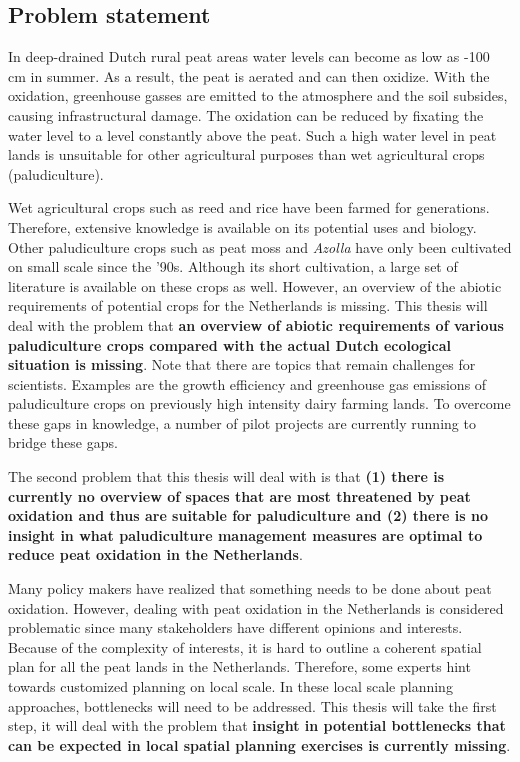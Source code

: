 \documentclass[12pt,a4paper,titlepage]{article}
\begin{document}



\subsection{Problem statement}
In deep-drained Dutch rural peat areas water levels can become as low as -100 cm in summer. As a result, the peat is aerated and can then oxidize. With the oxidation, greenhouse gasses are emitted to the atmosphere and the soil subsides, causing infrastructural damage. The oxidation can be reduced by fixating the water level to a level constantly above the peat. Such a high water level in peat lands is unsuitable for other agricultural purposes than wet agricultural crops (paludiculture).

Wet agricultural crops such as reed and rice have been farmed for generations. Therefore, extensive knowledge is available on its potential uses and biology. Other paludiculture crops such as peat moss and \textit{Azolla} have only been cultivated on small scale since the '90s. Although its short cultivation, a large set of literature is available on these crops as well.  However, an overview of the abiotic requirements of potential crops for the Netherlands is missing. This thesis will deal with the problem that \textbf{an overview of abiotic requirements of various paludiculture crops compared with the actual Dutch ecological situation is missing}. Note that there are topics that remain challenges for scientists. Examples are the growth efficiency and greenhouse gas emissions of paludiculture crops on previously high intensity dairy farming lands. To overcome these gaps in knowledge, a number of pilot projects are currently running to bridge these gaps.

The second problem that this thesis will deal with is that \textbf{(1) there is currently no overview of spaces that are most threatened by peat oxidation and thus are suitable for paludiculture and (2) there is no insight in what paludiculture management measures are optimal to reduce peat oxidation in the Netherlands}.

Many policy makers have realized that something needs to be done about peat oxidation. However, dealing with peat oxidation in the Netherlands is considered problematic since many stakeholders have different opinions and interests. Because of the complexity of interests, it is hard to outline a coherent spatial plan for all the peat lands in the Netherlands. Therefore, some experts hint towards customized planning on local scale. In these local scale planning approaches, bottlenecks will need to be addressed. This thesis will take the first step, it will deal with the problem that \textbf{insight in potential bottlenecks that can be expected in local spatial planning exercises is currently missing}.
\end{document}
